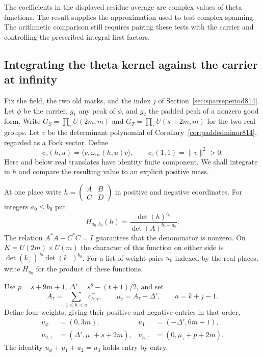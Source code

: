 \documentclass[a4paper,11pt]{article}
\theoremstyle{definition}
\theoremstyle{remark}
\numberwithin{equation}{section}
\begin{document}
The coefficients in the displayed residue average are
complex values of theta functions. The result supplies the
approximation used to test complex spanning. The arithmetic
comparison still requires pairing these tests with the
carrier and controlling the prescribed integral first factors.
\clearpage

\subsection{Integrating the theta kernel against the carrier at infinity}
\label{sec:carrierintegration815}
Fix the field, the two old marks, and the index \(j\) of
Section~\ref{sec:sparseperiod814}. Let \(\phi\) be the carrier,
\(g_1\) any peak of \(\phi\), and \(g_2\) the padded peak
of a nonzero good form. Write \(G_S=\prod_{\tau}U(2m,m)\)
and \(G_T=\prod_{\tau}U(s+2m,m)\) for the two real groups.
Let \(v\) be the determinant polynomial of
Corollary~\ref{cor:paddedminor814}, regarded as a Fock vector.
Define
\[
 c_v(h,u)=\langle v,\omega_\infty(h,u)v\rangle,\qquad
 c_v(1,1)=\|v\|^2>0 .
\]
Here and below real translates have identity finite component.
We shall integrate in \(h\) and compare the resulting value
to an explicit positive mass.

At one place write \(h=\left(\begin{smallmatrix}A&B\\ C&D\end{smallmatrix}\right)\)
in positive and negative coordinates. For integers \(a_0\le b_0\) put
\[
 H_{a_0,b_0}(h)=\frac{\det(h)^{b_0}}{\det(A)^{b_0-a_0}} .
\]
The relation \(A^*A-C^*C=I\) guarantees that the denominator
is nonzero. On \(K=U(2m)\times U(m)\) the character of this
function on either side is
\(\det(k_+)^{a_0}\det(k_-)^{b_0}\). For a list of weight
pairs \(u_0\) indexed by the real places, write \(H_{u_0}\)
for the product of these functions.

Use \(p=s+9m+1\), \(\Delta'=s^8-(t+1)/2\), and set
\[
 A_\tau=\sum_{1\le h<a}c^+_{h,\tau},\qquad
 \mu_\tau=A_\tau+\Delta',\qquad a=k+j-1 .
\]
Define four weights, giving their positive and negative
entries in that order,
\[
 \begin{aligned}
 u_\phi&=(0,3m),                 &u_1&=(-\Delta',6m+1),\\
 u_{2,\tau}&=(\Delta',\mu_\tau+s+2m),
                            &u_{3,\tau}&=(0,\mu_\tau+p+2m).
 \end{aligned}
\]
The identity \(u_\phi+u_1+u_2=u_3\) holds entry by entry.
\end{document}
